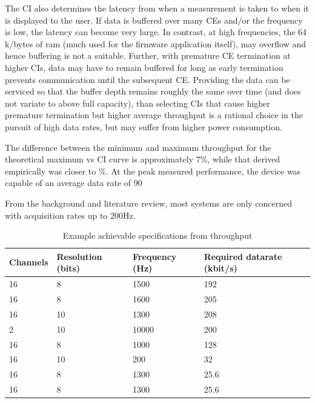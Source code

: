 \documentclass[]{article}
\begin{document}
The \ac{CI} also determines the latency from when a measurement is taken to when it is displayed to the user. If data is buffered over many \ac{CE}s and/or the frequency is low, the latency can become very large. In contrast, at high frequencies, the 64 k/bytes of ram (much used for the firmware application itself), may overflow and hence buffering is not a suitable. Further, with premature \ac{CE} termination at higher \ac{CI}s, data may have to remain buffered for long as early termination prevents communication until the subsequent \ac{CE}. Providing the data can be serviced so that the buffer depth remains roughly the same over time (and does not variate to above full capacity), than selecting \ac{CI}s that cause higher premature termination but higher average throughput is a rational choice in the pursuit of high data rates, but may suffer from higher power consumption.  



The difference between the minimum and maximum throughput for the theoretical maximum vs \ac{CI} curve is approximately 7$\%$, while that derived empirically was closer to $\%$. At the peak measured performance, the device was capable of an average data rate of 90%

From the background and literature review, most systems are only concerned with acquisition rates up to 200Hz.

\begin{table}[H]
\centering
\caption{Example achievable specifications from throughput}
\label{fig:sensors}
\begin{tabular}{|p{1.1in}|p{1.1in}|p{1.1in}|p{1.1in}|} \hline 
\textbf{Channels} & \textbf{Resolution (bits)} & \textbf{Frequency (Hz)} & \textbf{Required datarate (kbit/s)} \\ \hline 
16 & 8 & 1500 & 192 \\ \hline  
16 & 8 & 1600 & 205 \\ \hline
16 & 10 & 1300 & 208 \\ \hline  
2 & 10 & 10000 & 200  \\ \hline  
16 & 8 & 1000 & 128 \\ \hline  
16 & 10 & 200 & 32 \\ \hline  
16 & 8 & 1300 & 25.6 \\ \hline  
16 & 8 & 1300 & 25.6 \\ \hline  

\end{tabular}
\end{table}
\end{document}
